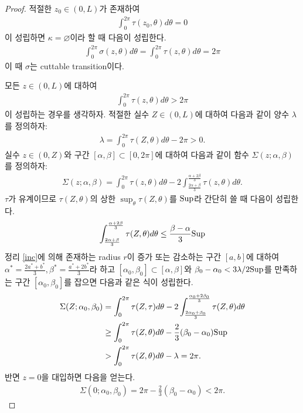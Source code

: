 \documentclass{amsart}
\theoremstyle{plain}
\theoremstyle{definition}
\theoremstyle{remark}
\begin{document}
\begin{proof}
\iffalse
적절한 $z_0\in(0,L)$가 존재하여
\begin{align*}
\int_0^{2\pi}\tau(z_0,\theta)d\theta=0
\end{align*}
이 성립하면 $\kappa=\varnothing$이라 할 때 다음이 성립한다.
\begin{align*}
\int_0^{2\pi}\sigma(z,\theta)d\theta=\int_0^{2\pi}\tau(z,\theta)d\theta=2\pi
\end{align*}
이 때 $\sigma$는 cuttable transition이다.

모든 $z\in(0,L)$에 대하여
\begin{align*}
\int_0^{2\pi}\tau(z,\theta)d\theta>2\pi
\end{align*}
이 성립하는 경우를 생각하자.
적절한 실수 $Z\in(0,L)$에 대하여 다음과 같이 양수 $\lambda$를 정의하자:
\begin{align*}
\lambda=\int_0^{2\pi}\tau(Z,\theta)d\theta-2\pi>0.
\end{align*}
실수 $z\in(0,Z)$와 구간 $[\alpha,\beta]\subset[0,2\pi]$에 대하여 다음과 같이 함수 $\Sigma(z;\alpha,\beta)$를 정의하자:
\begin{align*}
\Sigma(z;\alpha,\beta)=\int_0^{2\pi}\tau(z,\theta)d\theta-2\int_{\frac{2\alpha+\beta}3}^{\frac{\alpha+2\beta}3}\tau(z,\theta)d\theta.
\end{align*}
$\tau$가 유계이므로 $\tau(Z,\theta)$의 상한 $\sup_{\theta}\tau(Z,\theta)$를 ${\rm Sup}$라 간단히 쓸 때 다음이 성립한다.
\begin{align*}
\int_{\frac{2\alpha+\beta}3}^{\frac{\alpha+2\beta}3}\tau(Z,\theta)d\theta\le\frac{\beta-\alpha}3 {\rm Sup}
\end{align*}
정리 \ref{inc}에 의해 존재하는 radius $r$이 증가 또는 감소하는 구간 $[a,b]$에 대하여 $\alpha^*=\frac{2a^*+b^*}3, \beta^*=\frac{a^*+2b^*}3$라 하고 $[\alpha_0,\beta_0]\subset[\alpha,\beta]$와 $\beta_0-\alpha_0<3\lambda/2{\rm Sup}$를 만족하는 구간 $[\alpha_0,\beta_0]$를 잡으면 다음과 같은 식이 성립한다.
\begin{align*}
\Sigma(Z;\alpha_0,\beta_0)
&=\int_0^{2\pi}\tau(Z,\tau)d\theta-2\int_{\frac{2\alpha_0+\beta_0}3}^{\frac{\alpha_0+2\beta_0}3}\tau(Z,\theta)d\theta\\
&\ge\int_0^{2\pi}\tau(Z,\theta)d\theta-\frac23(\beta_0-\alpha_0){\rm Sup}\\
&>\int_0^{2\pi}\tau(Z,\theta)d\theta-\lambda=2\pi.
\end{align*}
반면 $z=0$을 대입하면 다음을 얻는다.
\begin{align*}
\Sigma(0;\alpha_0,\beta_0)=2\pi-\frac23(\beta_0-\alpha_0)<2\pi.

\end{align*}
\end{proof}
\end{document}
